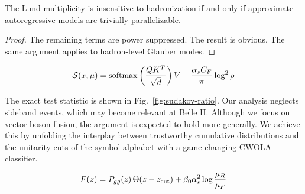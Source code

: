 \begin{theorem}[Interpretability]\label{thm:2}
The Lund multiplicity is insensitive to hadronization if and only if
approximate autoregressive models are trivially parallelizable.
\end{theorem}

\begin{proof}
The remaining terms are power suppressed. The result is obvious. The
same argument applies to hadron-level Glauber modes.
\end{proof}

\begin{equation}
  \mathcal{S}(x, \mu) = \mathrm{softmax}\left(\frac{Q K^T}{\sqrt{d}}\right) V - \frac{\alpha_s C_F}{\pi} \log^2 \rho
  \label{eq:4}
\end{equation}

The exact test statistic is shown in Fig.~\ref{fig:sudakov-ratio}. Our
analysis neglects sideband events, which may become relevant at Belle
II. Although we focus on vector boson fusion, the argument is expected
to hold more generally. We achieve this by unfolding the interplay
between trustworthy cumulative distributions and the unitarity cuts of
the symbol alphabet with a game-changing CWOLA classifier.

\begin{equation}
  F(z) = P_{gg}(z) \, \Theta(z - z_{\rm cut}) + \beta_0 \alpha_s^2 \log\frac{\mu_R}{\mu_F}
  \label{eq:6}
\end{equation}

